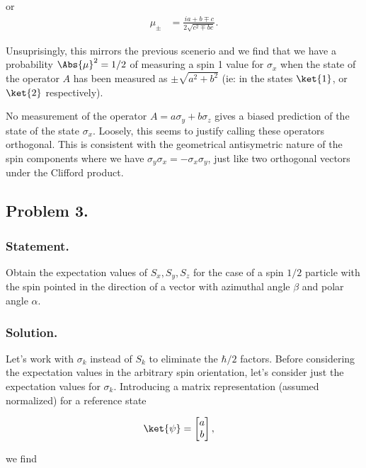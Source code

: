 or
\begin{align}\label{eqn:desaiCh5:212}
\mu_{\pm} &= 
\frac{ia + b \mp c}{2 \sqrt{c^2 \mp bc}} .
\end{align}

Unsuprisingly, this mirrors the previous scenerio and we find that we have a probability $\Abs{\mu}^2 = 1/2$ of measuring a spin 1 value for $\sigma_x$ when the state of the operator $A$ has been measured as $\pm \sqrt{a^2 + b^2}$ (ie: in the states $\ket{1}$, or $\ket{2}$ respectively).

No measurement of the operator $A = a \sigma_y + b\sigma_z$ gives a biased prediction of the state of the state $\sigma_x$.  Loosely, this seems to justify calling these operators orthogonal.  This is consistent with the geometrical antisymetric nature of the spin components where we have $\sigma_y \sigma_x = -\sigma_x \sigma_y$, just like two orthogonal vectors under the Clifford product.

\subsection{Problem 3.}
\subsubsection{Statement.}

Obtain the expectation values of $S_x, S_y, S_z$ for the case of a spin $1/2$ particle with the spin pointed in the direction of a vector with azimuthal angle $\beta$ and polar angle $\alpha$.

\subsubsection{Solution.}

Let's work with $\sigma_k$ instead of $S_k$ to eliminate the $\hbar/2$ factors.  Before considering the expectation values in the arbitrary spin orientation, let's consider just the expectation values for $\sigma_k$.  Introducing a matrix representation (assumed normalized) for a reference state

\begin{align}\label{eqn:desaiCh5:300}
\ket{\psi} &= 
\begin{bmatrix}
a \\
b
\end{bmatrix},
\end{align}

we find

